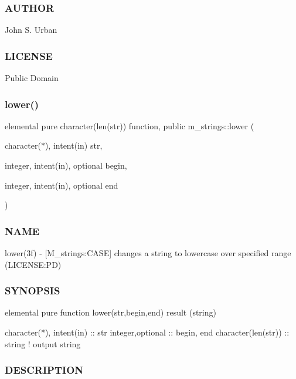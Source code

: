 \subsubsection*{A\+U\+T\+H\+OR}

John S. Urban \subsubsection*{L\+I\+C\+E\+N\+SE}

Public Domain \mbox{\label{namespacem__strings_a3c7d4be9051206e4b2f72112f9fdc3b4}} 
\subsubsection{\texorpdfstring{lower()}{lower()}}
{\footnotesize\ttfamily elemental pure character(len(str)) function, public m\+\_\+strings\+::lower (\begin{DoxyParamCaption}\item[{character($\ast$), intent(in)}]{str,  }\item[{integer, intent(in), optional}]{begin,  }\item[{integer, intent(in), optional}]{end }\end{DoxyParamCaption})}



\subsubsection*{N\+A\+ME}

lower(3f) -\/ \mbox{[}M\+\_\+strings\+:C\+A\+SE\mbox{]} changes a string to lowercase over specified range (L\+I\+C\+E\+N\+SE\+:PD) 

\subsubsection*{S\+Y\+N\+O\+P\+S\+IS}

\begin{DoxyVerb}elemental pure function lower(str,begin,end) result (string)

 character(*), intent(in) :: str
 integer,optional         :: begin, end
 character(len(str))      :: string  ! output string
\end{DoxyVerb}
 \subsubsection*{D\+E\+S\+C\+R\+I\+P\+T\+I\+ON}

